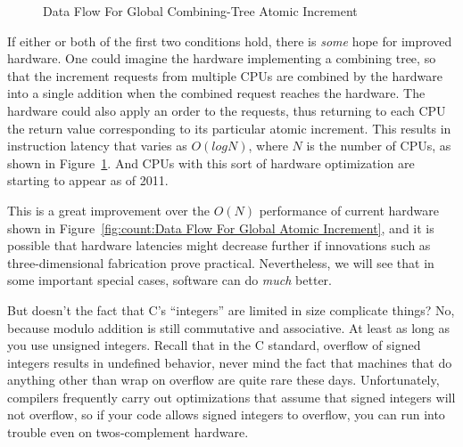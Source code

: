 \begin{figure}[tb]
\begin{center}
\end{center}
\caption{Data Flow For Global Combining-Tree Atomic Increment}
\label{fig:count:Data Flow For Global Combining-Tree Atomic Increment}
\end{figure}

	If either or both of the first two conditions hold, there is
	\emph{some} hope for improved hardware.
	One could imagine the hardware implementing a combining tree,
	so that the increment requests from multiple CPUs are combined
	by the hardware into a single addition when the combined request
	reaches the hardware.
	The hardware could also apply an order to the requests, thus
	returning to each CPU the return value corresponding to its
	particular atomic increment.
	This results in instruction latency that varies as $O(log N)$,
	where $N$ is the number of CPUs, as shown in
	Figure~\ref{fig:count:Data Flow For Global Combining-Tree Atomic Increment}.
	And CPUs with this sort of hardware optimization are starting to
	appear as of 2011.

	This is a great improvement over the $O(N)$ performance
	of current hardware shown in
	Figure~\ref{fig:count:Data Flow For Global Atomic Increment},
	and it is possible that hardware latencies might decrease
	further if innovations such as three-dimensional fabrication prove
	practical.
	Nevertheless, we will see that in some important special cases,
	software can do \emph{much} better.

\QuickQ{}
	But doesn't the fact that C's ``integers'' are limited in size
	complicate things?
\QuickA{}
	No, because modulo addition is still commutative and associative.
	At least as long as you use unsigned integers.
	Recall that in the C standard, overflow of signed integers results
	in undefined behavior, never mind the fact that machines that
	do anything other than wrap on overflow are quite rare these days.
	Unfortunately, compilers frequently carry out optimizations that
	assume that signed integers will not overflow, so if your code
	allows signed integers to overflow, you can run into trouble
	even on twos-complement hardware.

